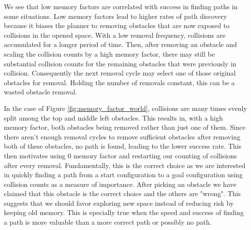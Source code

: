 

We see that low memory factors are correlated with success in finding paths in some situations. Low memory factors lead to higher rates of path discovery because it biases the planner to removing obstacles that are now exposed to collisions in the opened space. With a low removal frequency, collisions are accumulated for a longer period of time. Then, after removing an obstacle and scaling the collision counts by a high memory factor, there may still be substantial collision counts for the remaining obstacles that were previously in collision. Consequently the next removal cycle may select one of those original obstacles for removal. Holding the number of removals constant, this can be a wasted obstacle removal. 

In the case of Figure \ref{fig:memory_factor_world}, collisions are many times evenly split among the top and middle left obstacles. This results in, with a high memory factor, both obstacles being removed rather than just one of them. Since there aren't enough removal cycles to remove sufficient obstacles after removing both of these obstacles, no path is found, leading to the lower success rate. This then motivates using 0 memory factor and restarting our counting of collisions after every removal. Fundamentally, this is the correct choice as we are interested in quickly finding a path from a start configuration to a goal configuration using collision counts as a measure of importance. After picking an obstacle we have claimed that this obstacle is the correct choice and the others are "wrong". This suggests that we should favor exploring new space instead of reducing risk by keeping old memory. This is epecially true when the speed and success of finding a path is more valuable than a more correct path or possibly no path.


